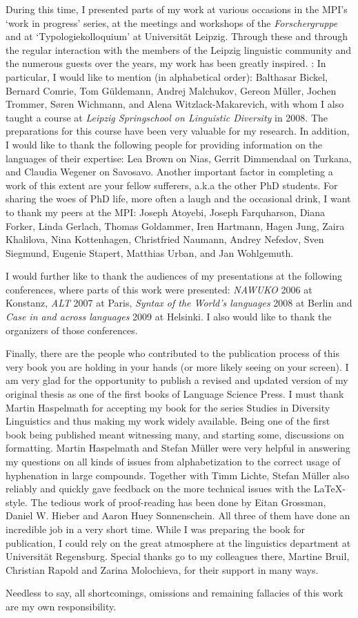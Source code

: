 During this time, I presented parts of my work at various occasions in the MPI's `work in progress' series, at the meetings and workshops of the \textit{Forschergruppe} and at `Typologiekolloquium' at Universit\"at Leipzig.
Through these and through the regular interaction with the members of the Leipzig linguistic community and the numerous guests over the years, my work has been greatly inspired.
: In particular, I would like to mention (in alphabetical order): Balthasar Bickel, Bernard Comrie, Tom G\"uldemann, Andrej Malchukov, Gereon M\"uller, Jochen Trommer, S\o ren Wichmann, and Alena Witzlack-Makarevich, with whom I also taught a course at \emph{Leipzig Springschool on Linguistic Diversity} in 2008. 
The preparations for this course have been very valuable for my research. 
In addition, I would like to thank the following people for providing information on the languages of their expertise:
Lea Brown on Nias, Gerrit Dimmendaal on Turkana, and Claudia Wegener on Savosavo.
Another important factor in completing a work of this extent are your fellow sufferers, a.k.a the other PhD students.
For sharing the woes of PhD life, more often a laugh and the occasional drink, I want to thank my peers at the MPI: Joseph Atoyebi, Joseph Farquharson, Diana Forker, Linda Gerlach, Thomas Goldammer, Iren Hartmann, Hagen Jung, Zaira Khalilova, Nina Kottenhagen, Christfried Naumann, Andrey Nefedov, Sven Siegmund, Eugenie Stapert, Matthias Urban, and Jan Wohlgemuth.

I would further like to thank the audiences of my presentations at the following conferences, where parts of this work were presented:
\emph{NAWUKO} 2006 at Konstanz,  \emph{ALT} 2007 at Paris, \emph{Syntax of the World's languages} 2008 at Berlin and \emph{Case in and across languages} 2009 at Helsinki. 
I also would like to thank the organizers of those conferences.

Finally, there are the people who contributed to the publication process of this very book you are holding in your hands (or more likely seeing on your screen). 
I am very glad for the opportunity to publish a revised and updated version of my original thesis as one of the first books of Language Science Press.
I must thank Martin Haspelmath for accepting my book for the series Studies in Diversity Linguistics and thus making my work widely available.
Being one of the first book being published meant witnessing many, and starting some, discussions on formatting.  
Martin Haspelmath and Stefan M\"uller were very helpful in answering my questions on all kinds of issues from alphabetization to the correct usage of hyphenation in large compounds.
Together with Timm Lichte, Stefan M\"uller also reliably and quickly gave feedback on the more technical issues with the \LaTeX -style.  
The tedious work of proof-reading has been done by Eitan Grossman, Daniel W. Hieber and Aaron Huey Sonnenschein. 
All three of them have done an incredible job in a very short time. 
While I was preparing the book for publication, I could rely on the great atmosphere at the linguistics department at Universität Regensburg. 
Special thanks go to my colleagues there, Martine Bruil, Christian Rapold and Zarina Molochieva, for their support in many ways. 

\enlargethispage{\baselineskip}
Needless to say, all shortcomings, omissions and remaining fallacies of this work are my own responsibility.



 